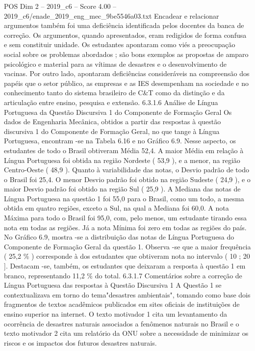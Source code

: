 \begin{textsample}{POS Dim 2 – 2019\_c6 – Score 4.00 – 2019\_c6/enade\_2019\_eng\_mec\_9be5546a03.txt}
Encadear e relacionar argumentos também foi uma deficiência identificada pelos docentes da banca de correção.
Os argumentos, quando apresentados, eram redigidos de forma confusa e sem constituir unidade.
Os estudantes apontaram como viés a preocupação social sobre os problemas abordados ; são bons exemplos as propostas de amparo psicológico e material para as vítimas de desastres e o desenvolvimento de vacinas.
Por outro lado, apontaram deficiências consideráveis na compreensão dos papéis que o setor público, as empresas e as IES desempenham na sociedade e no conhecimento tanto do sistema brasileiro de C\&T como da distinção e da articulação entre ensino, pesquisa e extensão. 6.3.1.6 Análise de Língua Portuguesa da Questão Discursiva 1 do Componente de Formação Geral Os dados de Engenharia Mecânica, obtidos a partir das respostas à questão discursiva 1 do Componente de Formação Geral, no que tange à Língua Portuguesa, encontram -se na Tabela 6.16 e no Gráfico 6.9.
Nesse aspecto, os estudantes de todo o Brasil obtiveram Média 52,4.
A maior Média em relação à Língua Portuguesa foi obtida na região Nordeste ( 53,9 ), e a menor, na região Centro-Oeste ( 48,9 ).
Quanto à variabilidade das notas, o Desvio padrão de todo o Brasil foi 25,4.
O menor Desvio padrão foi obtido na região Sudeste ( 24,9 ), e o maior Desvio padrão foi obtido na região Sul ( 25,9 ).
A Mediana das notas de Língua Portuguesa na questão 1 foi 55,0 para o Brasil, como um todo, a mesma obtida em quatro regiões, exceto a Sul, na qual a Mediana foi 60,0.
A nota Máxima para todo o Brasil foi 95,0, com, pelo menos, um estudante tirando essa nota em todas as regiões.
Já a nota Mínima foi zero em todas as regiões do país.
No Gráfico 6.9, mostra -se a distribuição das notas de Língua Portuguesa do Componente de Formação Geral da questão 1.
Observa -se que a maior frequência ( 25,2 \% ) corresponde à dos estudantes que obtiveram nota no intervalo ( 10 ; 20 ].
Destacam -se, também, os estudantes que deixaram a resposta à questão 1 em branco, representando 11,2 \% do total. 6.3.1.7 Comentários sobre a correção de Língua Portuguesa das respostas à Questão Discursiva 1 A Questão 1 se contextualizava em torno do tema"desastres ambientais", tomando como base dois fragmentos de textos acadêmicos publicados em sites oficiais de instituições de ensino superior na internet.
O texto motivador 1 cita um levantamento da ocorrência de desastres naturais associados a fenômenos naturais no Brasil e o texto motivador 2 cita um relatório da ONU sobre a necessidade de minimizar os riscos e os impactos dos futuros desastres naturais.

\end{textsample}
